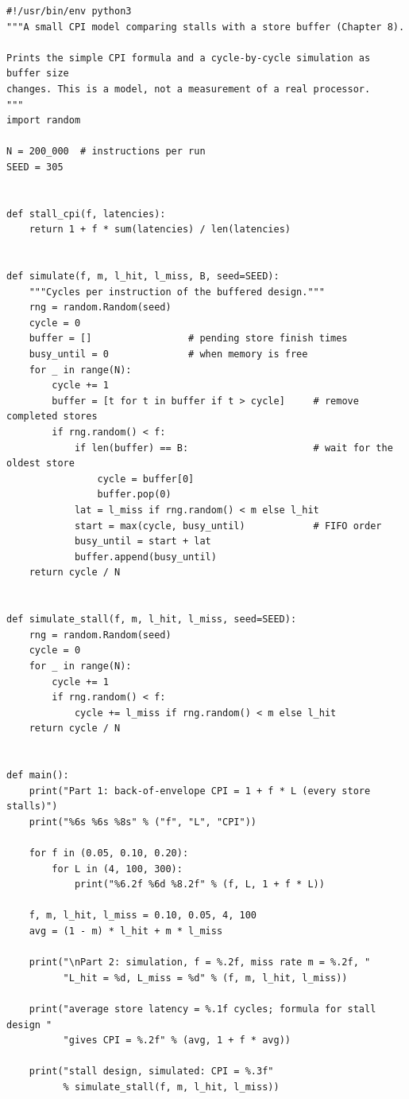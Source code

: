 \begin{lstlisting}[style=vspython]
#!/usr/bin/env python3
"""A small CPI model comparing stalls with a store buffer (Chapter 8).

Prints the simple CPI formula and a cycle-by-cycle simulation as buffer size
changes. This is a model, not a measurement of a real processor.
"""
import random

N = 200_000  # instructions per run
SEED = 305


def stall_cpi(f, latencies):
    return 1 + f * sum(latencies) / len(latencies)


def simulate(f, m, l_hit, l_miss, B, seed=SEED):
    """Cycles per instruction of the buffered design."""
    rng = random.Random(seed)
    cycle = 0
    buffer = []                 # pending store finish times
    busy_until = 0              # when memory is free
    for _ in range(N):
        cycle += 1
        buffer = [t for t in buffer if t > cycle]     # remove completed stores
        if rng.random() < f:
            if len(buffer) == B:                      # wait for the oldest store
                cycle = buffer[0]
                buffer.pop(0)
            lat = l_miss if rng.random() < m else l_hit
            start = max(cycle, busy_until)            # FIFO order
            busy_until = start + lat
            buffer.append(busy_until)
    return cycle / N


def simulate_stall(f, m, l_hit, l_miss, seed=SEED):
    rng = random.Random(seed)
    cycle = 0
    for _ in range(N):
        cycle += 1
        if rng.random() < f:
            cycle += l_miss if rng.random() < m else l_hit
    return cycle / N


def main():
    print("Part 1: back-of-envelope CPI = 1 + f * L (every store stalls)")
    print("%6s %6s %8s" % ("f", "L", "CPI"))

    for f in (0.05, 0.10, 0.20):
        for L in (4, 100, 300):
            print("%6.2f %6d %8.2f" % (f, L, 1 + f * L))

    f, m, l_hit, l_miss = 0.10, 0.05, 4, 100
    avg = (1 - m) * l_hit + m * l_miss

    print("\nPart 2: simulation, f = %.2f, miss rate m = %.2f, "
          "L_hit = %d, L_miss = %d" % (f, m, l_hit, l_miss))
    
    print("average store latency = %.1f cycles; formula for stall design "
          "gives CPI = %.2f" % (avg, 1 + f * avg))
    
    print("stall design, simulated: CPI = %.3f"
          % simulate_stall(f, m, l_hit, l_miss))
    

\end{lstlisting}

